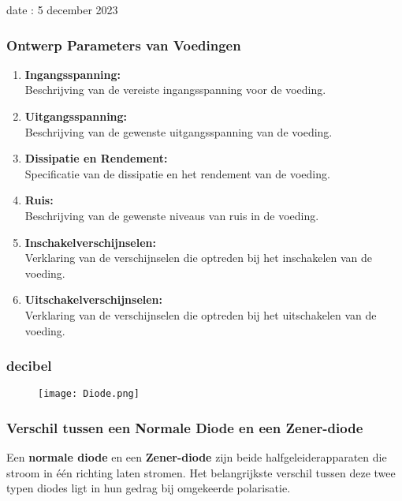 date : 5 december 2023

\subsubsection*{Ontwerp Parameters van Voedingen}

\begin{enumerate}[label=--]
  \item \textbf{Ingangsspanning:} \\
    Beschrijving van de vereiste ingangsspanning voor de voeding.

  \item \textbf{Uitgangsspanning:} \\
    Beschrijving van de gewenste uitgangsspanning van de voeding.

  \item \textbf{Dissipatie en Rendement:} \\
    Specificatie van de dissipatie en het rendement van de voeding.

  \item \textbf{Ruis:} \\
    Beschrijving van de gewenste niveaus van ruis in de voeding.

  \item \textbf{Inschakelverschijnselen:} \\
    Verklaring van de verschijnselen die optreden bij het inschakelen van de voeding.

  \item \textbf{Uitschakelverschijnselen:} \\
    Verklaring van de verschijnselen die optreden bij het uitschakelen van de voeding.
\end{enumerate}

\subsubsection{decibel}
\begin{figure}[H]
\centering
\texttt{[image: Diode.png]}
\end{figure}

\subsubsection*{Verschil tussen een Normale Diode en een Zener-diode}

Een \textbf{normale diode} en een \textbf{Zener-diode} zijn beide halfgeleiderapparaten die stroom in één richting laten stromen. Het belangrijkste verschil tussen deze twee typen diodes ligt in hun gedrag bij omgekeerde polarisatie.\\

